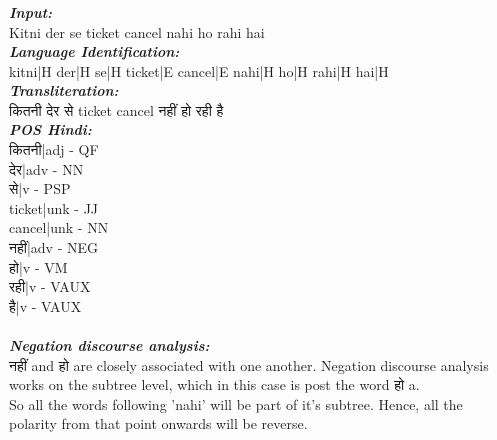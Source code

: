 \documentclass[12pt]{book}
\begin{document}
\subsubsection{\textbf{}}
\textbf{\textit{Input:}} \\
Kitni der se ticket cancel nahi ho rahi hai\\
\textbf{\textit{Language Identification:}}\\
kitni|H der|H se|H ticket|E cancel|E nahi|H ho|H rahi|H hai|H\\
\textbf{\textit{Transliteration:}} \\
\foreignlanguage{sanskrit}{
कितनी देर से
}
ticket cancel
\foreignlanguage{sanskrit}{
नहीं हो रही है  
}\\
\textbf{\textit{POS Hindi:}}\\
\hspace{20em}\foreignlanguage{sanskrit}{कितनी}|adj - QF\\
\hspace{20em}\foreignlanguage{sanskrit}{देर}|adv - NN\\
\hspace{20em}\foreignlanguage{sanskrit}{से}|v - PSP\\
\hspace{20em}ticket|unk - JJ\\
\hspace{20em}cancel|unk - NN\\
\hspace{20em}\foreignlanguage{sanskrit}{नहीं}|adv - NEG\\
\hspace{20em}\foreignlanguage{sanskrit}{हो}|v - VM\\
\hspace{20em}\foreignlanguage{sanskrit}{रही}|v - VAUX\\
\hspace{20em}\foreignlanguage{sanskrit}{है}|v - VAUX\\
\\
\textbf{\textit{Negation discourse analysis:}} \\
\foreignlanguage{sanskrit}{नहीं} and \foreignlanguage{sanskrit}{हो} are closely
associated with one another. Negation discourse analysis works on the subtree
level, which in this case is post the word \foreignlanguage{sanskrit}{हो} a. \\
So all the words following 'nahi' will be part of it's subtree. Hence, all the
polarity from that point onwards will be reverse.
\end{document}
